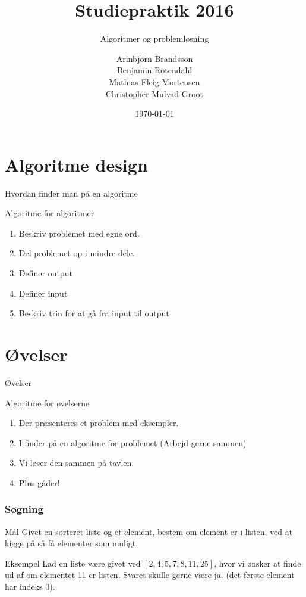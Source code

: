 \documentclass[12pt,t]{beamer}
\title{Studiepraktik 2016}
\subtitle{Algoritmer og problemløsning}
\author{
        Arinbjörn Brandsson \\
        Benjamin Rotendahl  \\
        Mathias Fleig Mortensen \\
        Christopher Mulvad Groot\\
}
\date[]{\today}
\begin{document}
\frame[plain]{\titlepage}

\section{Algoritme design}
    \begin{frame}[c]{Hvordan finder man på en algoritme}
        \begin{block}{Algoritme for algoritmer}
            \begin{enumerate}
                \item Beskriv problemet med egne ord. \pause
                \item Del problemet op i mindre dele. \pause
                \item Definer output \pause
                \item Definer input \pause
                \item Beskriv trin for at gå fra input til output
            \end{enumerate}
        \end{block}
    \end{frame}

\section{Øvelser}
        \begin{frame}[t]{Øvelser}
            \begin{block}{Algoritme for øvelserne}
                \begin{enumerate}
                    \item Der præsenteres et problem med eksempler. \pause
                    \item I finder på en algoritme for problemet
                          (Arbejd gerne sammen) \pause
                    \item Vi løser den sammen på tavlen. \pause
                    \item Plus gåder!
                \end{enumerate}
            \end{block}
        \end{frame}

    \begin{frame}
      \frametitle{Søgning}
      \begin{block}{Mål}
      Givet en sorteret liste og et element, bestem om element er i listen,
      ved at kigge på så få elementer som muligt.
      \end{block}
      \pause

      \begin{exampleblock}{Eksempel}
      Lad en liste være givet ved $[2, 4, 5, 7, 8, 11, 25]$, hvor vi ønsker at
      finde ud af om elementet 11 er listen. Svaret skulle gerne være ja.
      (det første element har indeks 0).
      \end{exampleblock}
    \end{frame}
\end{document}
